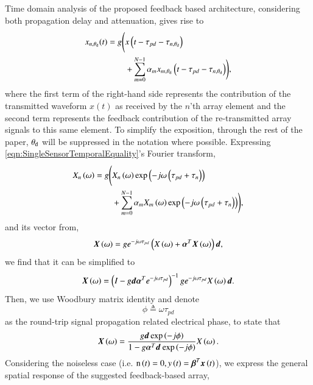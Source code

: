 Time domain analysis of the proposed feedback based architecture, considering both propagation delay and attenuation, gives rise to
\begin{equation}
    \label{eqn:SingleSensorTemporalEquality}
        \begin{split}
            x_{n,\thetaD}(t) = g\Bigg{(}&x\rBrace{t-\tau_{pd}-\tau_{n,\thetaD}}\\
            &+\sum_{m=0}^{N-1}{\alpha_{m}x_{m,\thetaD}\rBrace{t-\tau_{pd}-\tau_{n,\thetaD}}}\Bigg{)},
        \end{split}
\end{equation}
where the first term of the right-hand side represents the contribution of the transmitted waveform $x(t)$ as received by the $n$'th array element and the second term represents the feedback contribution of the re-transmitted array signals to this same element.
To simplify the exposition, through the rest of the paper, $\theta_{\text{d}}$ will be suppressed in the notation where possible.  
Expressing \eqref{eqn:SingleSensorTemporalEquality}'s Fourier transform,
\begin{equation}
    \label{eqn_singleSensorFourier}
        \begin{split}
            \F{x}_{n}\rBrace{\omega} =
            g\Bigg( & \F{x}_{n}\rBrace{\omega}
            \exp\rBrace{-j\omega\rBrace{\tau_{pd}+\tau_{n}}}
            \\&+\sum_{m=0}^{N-1}
            {
            \alpha_{m}\F{x}_{m}\rBrace{\omega}
            \exp\rBrace{-j\omega\rBrace{\tau_{pd}+\tau_{n}}}
            }\Bigg),
        \end{split}
\end{equation}
and its vector from,
$$
\F{\vx}\rBrace{\omega} = ge^{-j\omega\tau_{pd}} \rBrace{\F{x}\rBrace{\omega}+\vAlphaT \F{\vx}\rBrace{\omega}}\vd,
$$
we find that it can be simplified to
$$
\F{\vx}\rBrace{\omega} =\rBrace{I-g\vd\vAlphaT{}e^{-j\omega\tau_{pd}}}^{-1}ge^{-j\omega\tau_{pd}}\F{x}\rBrace{\omega} \vd.
$$
Then, we use Woodbury matrix identity \cite{woodbury1950inverting} and denote
\[
\phi\triangleq\omega\tau_{pd}
\]
as the round-trip signal propagation related electrical phase, to state that
$$
\F{\vx}\rBrace{\omega}
=
\frac{    
g\vd\exp{\rBrace{-j\phi}}
}{
1 - g\aTd{}\exp{\rBrace{-j\phi}}
}\F{x}\rBrace{\omega}.
$$
Considering the noiseless case (i.e. $\text{n}\left({t}\right)=0, y\left({t}\right)=\boldsymbol{\beta}^{T}{}\boldsymbol{x}\left({t}\right)$),
we express the general spatial response of the suggested feedback-based array, 
